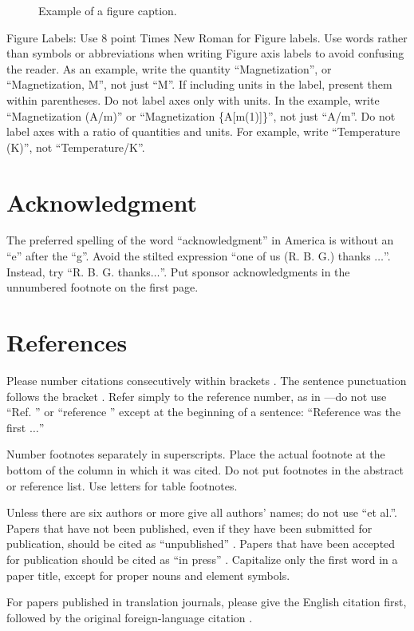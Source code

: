 \documentclass[
  twoside,
  openright,
  degree    = master,               %
  language  = english,              %
  fontset   = template,             %
  watermark = true,                 %
  doi       = true,                 %
]{ncs-ieee-conference}
\begin{document}
\begin{figure}[htbp]
  \caption{Example of a figure caption.}
  \label{fig}
\end{figure}

Figure Labels: Use 8 point Times New Roman for Figure labels. Use words
rather than symbols or abbreviations when writing Figure axis labels to
avoid confusing the reader. As an example, write the quantity
``Magnetization'', or ``Magnetization, M'', not just ``M''. If including
units in the label, present them within parentheses. Do not label axes only
with units. In the example, write ``Magnetization (A/m)'' or ``Magnetization
\{A[m(1)]\}'', not just ``A/m''. Do not label axes with a ratio of
quantities and units. For example, write ``Temperature (K)'', not
``Temperature/K''. \cite{Li:2019} \cite{Litman:2021}

\section*{Acknowledgment}

The preferred spelling of the word ``acknowledgment'' in America is without
an ``e'' after the ``g''. Avoid the stilted expression ``one of us (R. B.
G.) thanks $\ldots$''. Instead, try ``R. B. G. thanks$\ldots$''. Put sponsor
acknowledgments in the unnumbered footnote on the first page. \cite{Bayezit:2013, Cichella:2015, Honig:2018}

\section*{References}

Please number citations consecutively within brackets \cite{b1}. The
sentence punctuation follows the bracket \cite{b2}. Refer simply to the reference
number, as in \cite{b3}---do not use ``Ref. \cite{b3}'' or ``reference \cite{b3}'' except at
the beginning of a sentence: ``Reference \cite{b3} was the first $\ldots$''

Number footnotes separately in superscripts. Place the actual footnote at
the bottom of the column in which it was cited. Do not put footnotes in the
abstract or reference list. Use letters for table footnotes.

Unless there are six authors or more give all authors' names; do not use
``et al.''. Papers that have not been published, even if they have been
submitted for publication, should be cited as ``unpublished'' \cite{b4}. Papers
that have been accepted for publication should be cited as ``in press'' \cite{b5}.
Capitalize only the first word in a paper title, except for proper nouns and
element symbols.

For papers published in translation journals, please give the English
citation first, followed by the original foreign-language citation \cite{b6}.


\color{black}
\printbibliography
\end{document}
